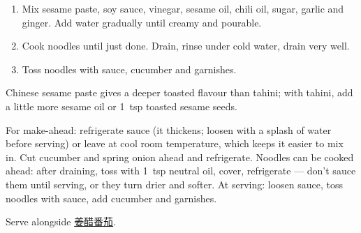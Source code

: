 \label{majiang-liangmian}

\begin{ingredients}
\end{ingredients}


\begin{recipe}
  \begin{enumerate}

  \item Mix sesame paste, soy sauce, vinegar, sesame oil, chili oil,
    sugar, garlic and ginger. Add water gradually until creamy and
    pourable.

  \item Cook noodles until just done. Drain, rinse under cold water,
    drain very well.

  \item Toss noodles with sauce, cucumber and garnishes.

  \end{enumerate}
\end{recipe}

\notes{} Chinese sesame paste gives a deeper toasted flavour than
tahini; with tahini, add a little more sesame oil or 1~tsp toasted
sesame seeds.

For make-ahead: refrigerate sauce (it thickens; loosen with a splash
of water before serving) or leave at cool room temperature, which
keeps it easier to mix in. Cut cucumber and spring onion ahead and
refrigerate. Noodles can be cooked ahead: after draining, toss with
1~tsp neutral oil, cover, refrigerate --- don't sauce them until
serving, or they turn drier and softer. At serving: loosen sauce,
toss noodles with sauce, add cucumber and garnishes.

Serve alongside \hyperref[jiangcu-fanqie]{姜醋番茄}.

